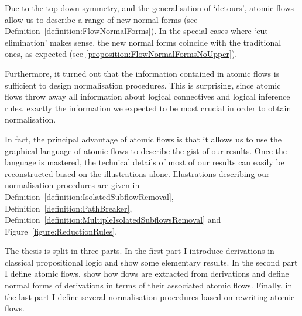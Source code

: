 Due to the top-down symmetry, and the generalisation of `detours', atomic flows allow us to describe a range of new normal forms (see Definition~\vref{definition:FlowNormalForms}). In the special cases where `cut elimination' makes sense, the new normal forms coincide with the traditional ones, as expected (see \vref{proposition:FlowNormalFormsNoUpper}).

Furthermore, it turned out that the information contained in atomic flows is sufficient to design normalisation procedures. This is surprising, since atomic flows throw away all information about logical connectives and logical inference rules, exactly the information we expected to be most crucial in order to obtain normalisation.

In fact, the principal advantage of atomic flows is that it allows us to use the graphical language of atomic flows to describe the gist of our results. Once the language is mastered, the technical details of most of our results can easily be reconstructed based on the illustrations alone. Illustrations describing our normalisation procedures are given in Definition~\vref{definition:IsolatedSubflowRemoval}, Definition~\vref{definition:PathBreaker}, Definition~\vref{definition:MultipleIsolatedSubflowsRemoval} and Figure~\vref{figure:ReductionRules}.

The thesis is split in three parts. In the first part I introduce derivations in classical propositional logic and show some elementary results. In the second part I define atomic flows, show how flows are extracted from derivations and define normal forms of derivations in terms of their associated atomic flows. Finally, in the last part I define several normalisation procedures based on rewriting atomic flows.
